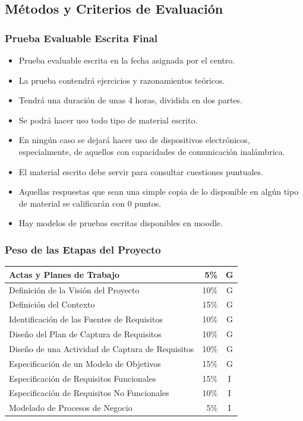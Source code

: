 \documentclass[a4paper,slidestop,xcolor=pst,dvips,blue]{beamer}
\begin{document}
\subsection{Métodos y Criterios de Evaluación}

\begin{frame}
	\frametitle{Prueba Evaluable Escrita Final}
	\begin{itemize}[<+->]
		\item Prueba evaluable escrita en la fecha asignada por el centro.
		\item La prueba contendrá ejercicios y razonamientos teóricos.
		\item Tendrá una duración de unas 4 horas, dividida en dos partes.
        \item Se podrá hacer uso todo tipo de material escrito.
        \item En ningún caso se dejará hacer uso de dispositivos electrónicos, especialmente, de aquellos con capacidades de comunicación inalámbrica.
		\item El material escrito debe servir para consultar cuestiones puntuales.
		\item \alert{Aquellas respuestas que sean una simple copia de lo disponible en algún tipo de material se calificarán con 0 puntos.}
        \item Hay modelos de pruebas escritas disponibles en moodle.
	\end{itemize}
\end{frame}

\begin{frame}[c]
	\frametitle{Peso de las Etapas del Proyecto}
    \begin{center}
	\begin{tabular}{||l|r|c||}
    \hline \hline
    Actas y Planes de Trabajo                   &  5\% & G \\ \hline
    Definición de la Visión del Proyecto        & 10\% & G \\ \hline
    Definición del Contexto                     & 15\% & G \\ \hline
    Identificación de las Fuentes de Requisitos & 10\% & G \\ \hline
    Diseño del Plan de Captura de Requisitos    & 10\% & G \\ \hline \hline
    Diseño de una Actividad de Captura de Requisitos & 10\% & G \\ \hline
    Especificación de un Modelo de Objetivos    & 15\% & G \\ \hline
    Especificación de Requisitos Funcionales    & 15\% & I \\ \hline
    Especificación de Requisitos No Funcionales & 10\% & I \\ \hline \hline
    Modelado de Procesos de Negocio             &  5\% & I \\ \hline \hline
	\end{tabular}
\end{center}
\end{frame}
\end{document}
